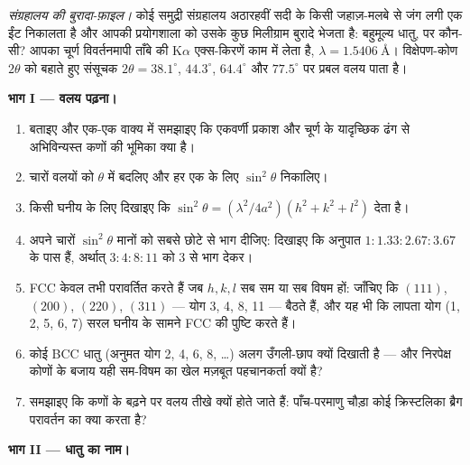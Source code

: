 \begin{problem}\label{pb:b3:crystalline-solids:1}
\emph{संग्रहालय की बुरादा-फ़ाइल।} कोई समुद्री संग्रहालय अठारहवीं सदी
के किसी जहाज़-मलबे से जंग लगी एक ईंट निकालता है और आपकी प्रयोगशाला को
उसके कुछ मिलीग्राम बुरादे भेजता है: बहुमूल्य धातु, पर कौन-सी? आपका
चूर्ण विवर्तनमापी ताँबे की K$\alpha$ एक्स-किरणें काम में लेता है,
$\lambda = \qty{1.5406}{\angstrom}$। विक्षेपण-कोण
$2\theta$ को बहाते हुए संसूचक $2\theta =
38.1^\circ$, $44.3^\circ$, $64.4^\circ$ और $77.5^\circ$ पर प्रबल
वलय पाता है।

\medskip\noindent\textbf{भाग I --- वलय पढ़ना।}

\begin{enumerate}
  \item {} बताइए और एक-एक वाक्य में समझाइए कि
        एकवर्णी प्रकाश और चूर्ण के यादृच्छिक ढंग से अभिविन्यस्त
        कणों की भूमिका क्या है।
  \item चारों वलयों को $\theta$ में बदलिए और हर एक के लिए
        $\sin^2\theta$ निकालिए।
  \item किसी घनीय  के लिए दिखाइए कि 
        $\sin^2\theta = (\lambda^2/4a^2)(h^2 + k^2 + l^2)$ देता है।
  \item अपने चारों $\sin^2\theta$ मानों को सबसे छोटे से भाग दीजिए:
        दिखाइए कि अनुपात $1 : 1.33 : 2.67 : 3.67$ के पास हैं,
        अर्थात् $3 : 4 : 8 : 11$ को 3 से भाग देकर।
  \item FCC  केवल तभी परावर्तित करते हैं जब $h, k, l$ सब सम
        या सब विषम हों: जाँचिए कि $(111)$, $(200)$, $(220)$, $(311)$
        --- योग 3, 4, 8, 11 --- बैठते हैं, और यह भी कि लापता योग
        (1, 2, 5, 6, 7) सरल घनीय के सामने FCC की पुष्टि करते हैं।
  \item कोई BCC धातु (अनुमत योग 2, 4, 6, 8, \dots) अलग उँगली-छाप
        क्यों दिखाती है --- और निरपेक्ष कोणों के बजाय यही सम-विषम
        का खेल मज़बूत पहचानकर्ता क्यों है?
  \item समझाइए कि कणों के बढ़ने पर वलय तीखे क्यों होते जाते हैं:
        पाँच-परमाणु चौड़ा कोई क्रिस्टलिका ब्रैग परावर्तन का क्या
        करता है?
\end{enumerate}

\medskip\noindent\textbf{भाग II --- धातु का नाम।}


\end{problem}
